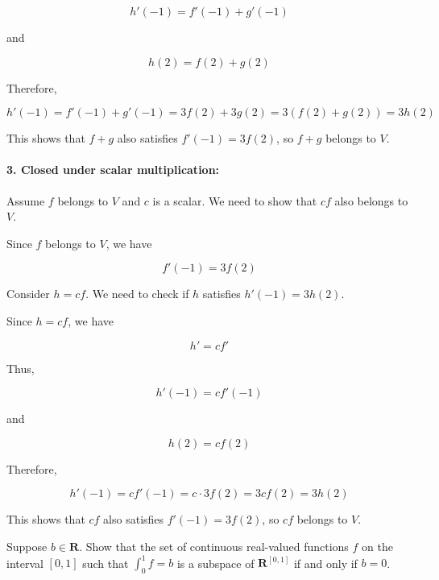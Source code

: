 \begin{solution}
\[
h'(-1) = f'(-1) + g'(-1)
\]

and

\[
h(2) = f(2) + g(2)
\]

Therefore,

\[
h'(-1) = f'(-1) + g'(-1) = 3f(2) + 3g(2) = 3(f(2) + g(2)) = 3h(2)
\]

This shows that \( f + g \) also satisfies \( f'(-1) = 3f(2) \), so \( f + g \) belongs to \( V \).

\paragraph{3. Closed under scalar multiplication:}

Assume \( f \) belongs to \( V \) and \( c \) is a scalar. We need to show that \( cf \) also belongs to \( V \).

Since \( f \) belongs to \( V \), we have

\[
f'(-1) = 3f(2)
\]

Consider \( h = cf \). We need to check if \( h \) satisfies \( h'(-1) = 3h(2) \).

Since \( h = cf \), we have

\[
h' = c f'
\]

Thus,

\[
h'(-1) = c f'(-1)
\]

and

\[
h(2) = c f(2)
\]

Therefore,

\[
h'(-1) = c f'(-1) = c \cdot 3f(2) = 3c f(2) = 3h(2)
\]

This shows that \( cf \) also satisfies \( f'(-1) = 3f(2) \), so \( cf \) belongs to \( V \).
\end{solution}

\begin{exercise}
    Suppose $b \in \mathbf{R}$. Show that the set of continuous real-valued functions $f$ on the interval $[0,1]$ such that $\int_{0}^{1} f=b$ is a subspace of $\mathbf{R}^{[0,1]}$ if and only if $b=0$.
\end{exercise}

